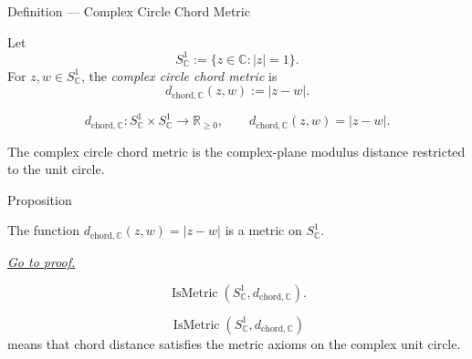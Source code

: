\begin{definitionbox}{Definition --- Complex Circle Chord Metric}
\begin{definition}\label{def:complex-circle-chord-metric}
Let
\[
  S^1_{\mathbb{C}}
  :=
  \{z\in\mathbb{C}: |z|=1\}.
\]
For \(z,w\in S^1_{\mathbb{C}}\), the \emph{complex circle chord metric} is
\[
  d_{\mathrm{chord},\mathbb{C}}(z,w):=|z-w|.
\]
\end{definition}
\end{definitionbox}

\begin{remark*}
\[
d_{\mathrm{chord},\mathbb{C}}:
S^1_{\mathbb{C}}\times S^1_{\mathbb{C}}\to\mathbb{R}_{\geq 0},
\qquad
d_{\mathrm{chord},\mathbb{C}}(z,w)=|z-w|.
\]
\end{remark*}

\begin{remark*}[Interpretation]
The complex circle chord metric is the complex-plane modulus distance
restricted to the unit circle.
\end{remark*}


\DefinitionalRoot

\begin{propositionbox}{Proposition}
\begin{proposition}
\label{prop:complex-circle-chord-metric}
The function \(d_{\mathrm{chord},\mathbb{C}}(z,w)=|z-w|\) is a metric
on \(S^1_{\mathbb{C}}\).

\smallskip
\noindent
\hyperref[prf:complex-circle-chord-metric]{\textit{Go to proof.}}
\end{proposition}
\end{propositionbox}

\begin{remark*}
\[
  \operatorname{IsMetric}(S^1_{\mathbb{C}},d_{\mathrm{chord},\mathbb{C}}).
\]
\end{remark*}

\begin{remark*}
\[
\operatorname{IsMetric}(S^1_{\mathbb{C}},d_{\mathrm{chord},\mathbb{C}})
\]
means that chord distance satisfies the metric axioms on the complex unit
circle.
\end{remark*}

